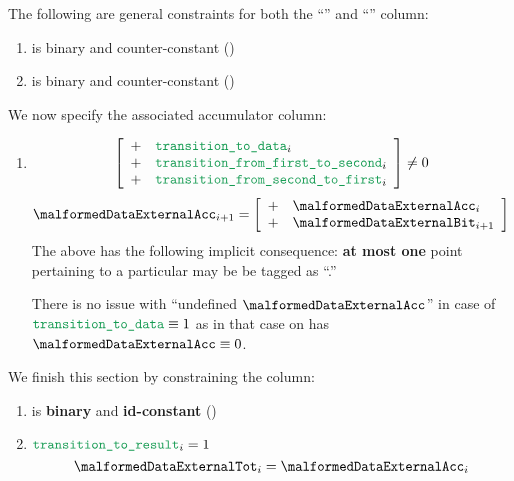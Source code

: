 The following are general constraints for both the ``'' and ``'' column:
\begin{enumerate}[resume]
    \item \malformedDataExternalBit{} is binary and counter-constant \quad (\trash)
    \item \malformedDataExternalAcc{} is binary and counter-constant \quad (\trash)
\end{enumerate}
We now specify the associated accumulator column:
\begin{enumerate}[resume]
    \item \If
        \[
            \left[ \begin{array}{cl}
                + & \locTransitionToData            _{i} \\
                + & \locTransitionFromFirstToSecond _{i} \\
                + & \locTransitionFromSecondToFirst _{i} \\
            \end{array} \right]
            \neq 0
        \]
        \Then
        \[
            \malformedDataExternalAcc _{i + 1} =
            \left[ \begin{array}{cl}
                + & \malformedDataExternalAcc _{i}     \\
                + & \malformedDataExternalBit _{i + 1} \\
            \end{array} \right]
        \]
        \saNote{}
        The above has the following implicit consequence: \textbf{at most one} point pertaining to a particular \blsId{} may be be tagged as ``\malformedDataExternalBit.''

        \saNote{}
        There is no issue with ``undefined $\malformedDataExternalAcc$'' in case of $\locTransitionToData \equiv 1$
        as in that case on has $\malformedDataExternalAcc \equiv 0$.
\end{enumerate}
We finish this section by constraining the \malformedDataExternalTot{} column:
\begin{enumerate}[resume]
    \item \malformedDataExternalTot{} is \textbf{binary} and \textbf{id-constant} \quad (\trash)
    \item \If $\locTransitionToResult_{i} = 1$ \Then
        \[
            \malformedDataExternalTot_{i} = \malformedDataExternalAcc _{i}
        \]
\end{enumerate}
